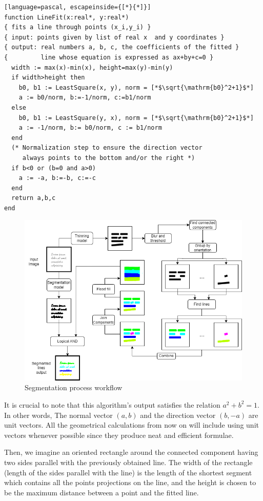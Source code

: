 \begin{lstlisting}[language=pascal, escapeinside={[*}{*]}]
function LineFit(x:real*, y:real*)
{ fits a line through points (x_i,y_i) }
{ input: points given by list of real x  and y coordinates }
{ output: real numbers a, b, c, the coefficients of the fitted }
{         line whose equation is expressed as ax+by+c=0 }
  width := max(x)-min(x), height=max(y)-min(y)
  if width>height then
    b0, b1 := LeastSquare(x, y), norm = [*$\sqrt{\mathrm{b0}^2+1}$*]
    a := b0/norm, b:=-1/norm, c:=b1/norm
  else
    b0, b1 := LeastSquare(y, x), norm = [*$\sqrt{\mathrm{b0}^2+1}$*]
    a := -1/norm, b:= b0/norm, c := b1/norm
  end
  (* Normalization step to ensure the direction vector
     always points to the bottom and/or the right *)
  if b<0 or (b=0 and a>0)
    a := -a, b:=-b, c:=-c
  end
  return a,b,c
end
\end{lstlisting}


\begin{figure}[htbp]
    \centering
        \includegraphics[scale=0.7]{figures/segmentation_flow.png}
    \caption{Segmentation process workflow}
    \label{FigSegFlow}        
\end{figure}

It is crucial to note that this algorithm's output satisfies the relation $a^2+b^2=1$. In other words, The normal vector $(a,b)$ and the direction vector $(b, -a)$ are unit vectors. All the geometrical calculations from now on will include using unit vectors whenever possible since they produce neat and efficient formulae.

Then, we imagine an oriented rectangle around the connected component having two sides parallel with the previously obtained line. The width of the rectangle (length of the sides parallel with the line) is the length of the shortest segment which contains all the points projections on the line, and the height is chosen to be the maximum distance between a point and the fitted line. 

